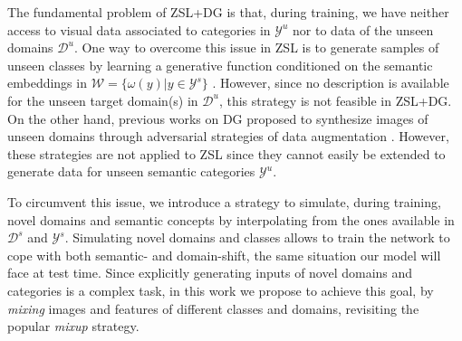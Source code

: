 \documentclass[runningheads]{llncs}
\begin{document}
The fundamental problem of ZSL+DG is that, during training, we have neither access to visual data associated to categories in $\mathcal{Y}^u$ nor to data of the unseen domains $\mathcal{D}^u$. One way to overcome this issue in ZSL is to generate samples of unseen classes by learning a generative function conditioned on the semantic embeddings in {$\mathcal{W}=\{\omega(y) | y\in\mathcal{Y}^{s}\}$} \cite{xian2018feature,xian2019fvaegan}. However, since no {description} is available for the unseen target domain(s) in $\mathcal{D}^u$, this strategy is not feasible in ZSL+DG. On the other hand, previous works on DG proposed to synthesize images of unseen domains through adversarial strategies of data augmentation  {\cite{volpi2018generalizing,shankar2018generalizing}}. However, these strategies are not applied to ZSL since they cannot easily be extended to generate data for unseen semantic categories 
$\mathcal{Y}^u$. 

To circumvent this issue, we introduce a strategy to simulate, during training, novel domains and semantic concepts by interpolating from the ones available in $\mathcal{D}^s$ and $\mathcal{Y}^s$. Simulating novel domains and classes allows to train the network to cope with both semantic- and domain-shift, the same situation our model will face at test time. Since explicitly generating inputs of novel domains and categories is a complex task, in this work we propose to achieve this goal, by \textit{mixing} images and features of different classes and domains, revisiting the popular \textit{mixup} \cite{zhang2017mixup} strategy. 
\end{document}
